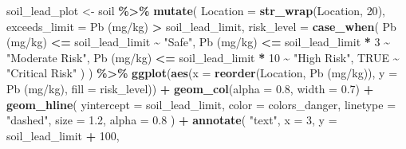 \documentclass[
]{article}
\newenvironment{Shaded}{\begin{snugshade}}{\end{snugshade}}
\newcommand{\AttributeTok}[1]{\textcolor[rgb]{0.13,0.29,0.53}{#1}}
\newcommand{\ConstantTok}[1]{\textcolor[rgb]{0.56,0.35,0.01}{#1}}
\newcommand{\DecValTok}[1]{\textcolor[rgb]{0.00,0.00,0.81}{#1}}
\newcommand{\FloatTok}[1]{\textcolor[rgb]{0.00,0.00,0.81}{#1}}
\newcommand{\FunctionTok}[1]{\textcolor[rgb]{0.13,0.29,0.53}{\textbf{#1}}}
\newcommand{\NormalTok}[1]{#1}
\newcommand{\OtherTok}[1]{\textcolor[rgb]{0.56,0.35,0.01}{#1}}
\newcommand{\SpecialCharTok}[1]{\textcolor[rgb]{0.81,0.36,0.00}{\textbf{#1}}}
\newcommand{\StringTok}[1]{\textcolor[rgb]{0.31,0.60,0.02}{#1}}
\begin{document}
\begin{Shaded}
\begin{Highlighting}[]
\NormalTok{soil\_lead\_plot }\OtherTok{\textless{}{-}}\NormalTok{ soil }\SpecialCharTok{\%\textgreater{}\%}
  \FunctionTok{mutate}\NormalTok{(}
    \AttributeTok{Location =} \FunctionTok{str\_wrap}\NormalTok{(Location, }\DecValTok{20}\NormalTok{),}
    \AttributeTok{exceeds\_limit =} \StringTok{\textasciigrave{}}\AttributeTok{Pb (mg/kg)}\StringTok{\textasciigrave{}} \SpecialCharTok{\textgreater{}}\NormalTok{ soil\_lead\_limit,}
    \AttributeTok{risk\_level =} \FunctionTok{case\_when}\NormalTok{(}
      \StringTok{\textasciigrave{}}\AttributeTok{Pb (mg/kg)}\StringTok{\textasciigrave{}} \SpecialCharTok{\textless{}=}\NormalTok{ soil\_lead\_limit }\SpecialCharTok{\textasciitilde{}} \StringTok{"Safe"}\NormalTok{,}
      \StringTok{\textasciigrave{}}\AttributeTok{Pb (mg/kg)}\StringTok{\textasciigrave{}} \SpecialCharTok{\textless{}=}\NormalTok{ soil\_lead\_limit }\SpecialCharTok{*} \DecValTok{3} \SpecialCharTok{\textasciitilde{}} \StringTok{"Moderate Risk"}\NormalTok{,}
      \StringTok{\textasciigrave{}}\AttributeTok{Pb (mg/kg)}\StringTok{\textasciigrave{}} \SpecialCharTok{\textless{}=}\NormalTok{ soil\_lead\_limit }\SpecialCharTok{*} \DecValTok{10} \SpecialCharTok{\textasciitilde{}} \StringTok{"High Risk"}\NormalTok{,}
      \ConstantTok{TRUE} \SpecialCharTok{\textasciitilde{}} \StringTok{"Critical Risk"}
\NormalTok{    )}
\NormalTok{  ) }\SpecialCharTok{\%\textgreater{}\%}
  \FunctionTok{ggplot}\NormalTok{(}\FunctionTok{aes}\NormalTok{(}\AttributeTok{x =} \FunctionTok{reorder}\NormalTok{(Location, }\StringTok{\textasciigrave{}}\AttributeTok{Pb (mg/kg)}\StringTok{\textasciigrave{}}\NormalTok{), }\AttributeTok{y =} \StringTok{\textasciigrave{}}\AttributeTok{Pb (mg/kg)}\StringTok{\textasciigrave{}}\NormalTok{, }\AttributeTok{fill =}\NormalTok{ risk\_level)) }\SpecialCharTok{+}
  \FunctionTok{geom\_col}\NormalTok{(}\AttributeTok{alpha =} \FloatTok{0.8}\NormalTok{, }\AttributeTok{width =} \FloatTok{0.7}\NormalTok{) }\SpecialCharTok{+}
  \FunctionTok{geom\_hline}\NormalTok{(}
    \AttributeTok{yintercept =}\NormalTok{ soil\_lead\_limit, }
    \AttributeTok{color =}\NormalTok{ colors\_danger, }
    \AttributeTok{linetype =} \StringTok{"dashed"}\NormalTok{, }
    \AttributeTok{size =} \FloatTok{1.2}\NormalTok{,}
    \AttributeTok{alpha =} \FloatTok{0.8}
\NormalTok{  ) }\SpecialCharTok{+}
  \FunctionTok{annotate}\NormalTok{(}
    \StringTok{"text"}\NormalTok{,}
    \AttributeTok{x =} \DecValTok{3}\NormalTok{, }\AttributeTok{y =}\NormalTok{ soil\_lead\_limit }\SpecialCharTok{+} \DecValTok{100}\NormalTok{,}

\end{Highlighting}
\end{Shaded}
\end{document}
